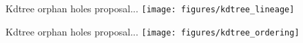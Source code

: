 \documentclass{beamer}
\begin{document}
\begin{frame}{Kdtree orphan holes proposal...}
  \centering
  \texttt{[image: figures/kdtree\_lineage]}
\end{frame}
\begin{frame}{Kdtree orphan holes proposal...}
  \centering
  \texttt{[image: figures/kdtree\_ordering]}
\end{frame}


\end{document}
